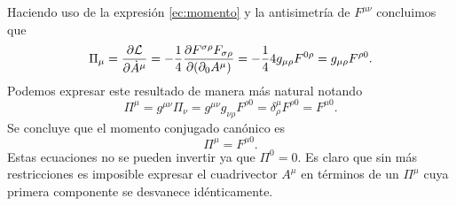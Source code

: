 \documentclass{article}
\begin{document}
Haciendo uso de la expresión \eqref{ec:momento} y la antisimetría de $F^{\mu\nu}$ concluimos que
\begin{equation}
\Pi_\mu=\pdv{\mathcal{L}}{\dot{A}^\mu}=-\frac{1}{4}\pdv{F^{\sigma\rho}F_{\sigma\rho}}{(\partial_0A^\mu)}=-\frac{1}{4}4g_{\mu\rho}F^{0\rho}=g_{\mu\rho} F^{\rho 0}.
\end{equation}
Podemos expresar este resultado de manera más natural notando
\begin{equation}
\Pi^\mu=g^{\mu\nu}\Pi_\nu=g^{\mu\nu}g_{\nu\rho}F^{\rho 0}=\delta^\mu_\rho F^{\rho 0}=F^{\mu 0}.
\end{equation}
Se concluye que el momento conjugado canónico es
\begin{equation}
\Pi^\mu=F^{\mu 0}.
\end{equation}
Estas ecuaciones no se pueden invertir ya que $\Pi^0=0$. Es claro que sin más restricciones es imposible expresar el cuadrivector $A^\mu$ en términos de un $\Pi^\mu$ cuya primera componente se desvanece idénticamente.
\end{document}
